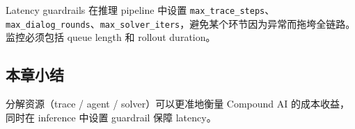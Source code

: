 \begin{knowledgebox}{Latency guardrails}
在推理 pipeline 中设置 \texttt{max\_trace\_steps}、\texttt{max\_dialog\_rounds}、\texttt{max\_solver\_iters}，避免某个环节因为异常而拖垮全链路。监控必须包括 queue length 和 rollout duration。
\end{knowledgebox}

\subsection{本章小结}

分解资源（trace / agent / solver）可以更准地衡量 Compound AI 的成本收益，同时在 inference 中设置 guardrail 保障 latency。

